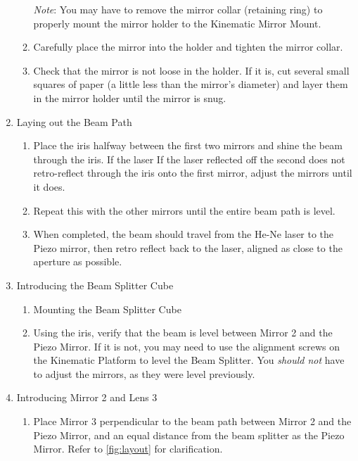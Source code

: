 \begin{enumerate}
\begin{enumerate}
        \emph{Note}: You may have to remove the mirror collar (retaining ring)
        to properly mount the mirror holder to the Kinematic Mirror Mount.
        \item Carefully place the mirror into the holder and tighten the mirror
        collar.
        \item Check that the mirror is not loose in the holder. If it is, cut
        several small squares of paper (a little less than the mirror's
        diameter) and layer them in the mirror holder until the mirror is snug.
        \end{enumerate}
    \item Laying out the Beam Path
    \label{step:leveling}
        \begin{enumerate}
        \item Place the iris halfway between the first two mirrors and shine the
        beam through the iris. If the laser If the laser reflected off the
        second does not retro-reflect through the iris onto the first mirror,
        adjust the mirrors until it does.
        \item Repeat this with the other mirrors until the entire beam path is
        level.
        \item When completed, the beam should travel from the He-Ne laser to the
        Piezo mirror, then retro reflect back to the laser, aligned as close to
        the aperture as possible.
        \end{enumerate}
    \item Introducing the Beam Splitter Cube
        \begin{enumerate}
        \item Mounting the Beam Splitter Cube
        \item Using the iris, verify that the beam is level between Mirror 2 and
        the Piezo Mirror. If it is not, you may need to use the alignment screws
        on the Kinematic Platform to level the Beam Splitter. You \emph{should
        not} have to adjust the mirrors, as they were level previously.
        \label{step:beamsplitter_level}
        \end{enumerate}
    \item Introducing Mirror 2 and Lens 3
        \begin{enumerate}
        \item Place Mirror 3 perpendicular to the beam path between Mirror 2 and
        the Piezo Mirror, and an equal distance from the beam splitter as the
        Piezo Mirror. Refer to \ref{fig:layout} for clarification.

\end{enumerate}
\end{enumerate}
